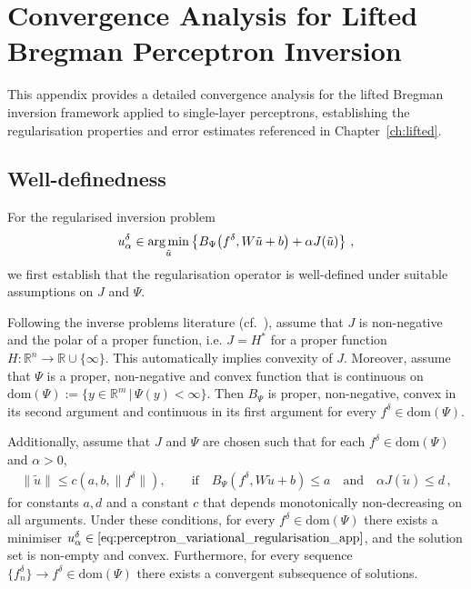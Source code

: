 \section{Convergence Analysis for Lifted Bregman Perceptron Inversion}\label{app:perceptron_inversion_convergence}

This appendix provides a detailed convergence analysis for the lifted Bregman inversion framework applied to single-layer perceptrons, establishing the regularisation properties and error estimates referenced in Chapter~\ref{ch:lifted}.

\subsection{Well-definedness}

For the regularised inversion problem
\begin{align}
    u_\alpha^\delta \in \operatorname*{arg\,min}_{\tilde{u}} \left\{ B_\Psi\!\left(f^\delta, W\tilde{u}+b\right) + \alpha J(\tilde{u}) \right\} \, ,\label{eq:perceptron_variational_regularisation_app}
\end{align}
we first establish that the regularisation operator is well-defined under suitable assumptions on $J$ and $\Psi$.

Following the inverse problems literature (cf.~\cite{benning2018modern}), assume that $J$ is non-negative and the polar of a proper function, i.e. $J = H^\ast$ for a proper function $H:\mathbb{R}^n \rightarrow \mathbb{R} \cup \{ \infty \}$. This automatically implies convexity of $J$. Moreover, assume that $\Psi$ is a proper, non-negative and convex function that is continuous on $\text{dom}(\Psi) := \{ y \in \mathbb{R}^m \,|\, \Psi(y) < \infty \}$. Then $B_\Psi$ is proper, non-negative, convex in its second argument and continuous in its first argument for every $f^\delta \in \text{dom}(\Psi)$. 

Additionally, assume that $J$ and $\Psi$ are chosen such that for each $f^\delta \in \text{dom}(\Psi)$ and $\alpha > 0$,
\begin{align*}
    \| \tilde{u} \| \leq c(a, b, \| f^\delta \|), \qquad \text{if} \quad B_\Psi(f^\delta, W\tilde{u} + b) \leq a \quad \text{and} \quad \alpha J(\tilde{u}) \leq d \, ,
\end{align*}
for constants $a, d$ and a constant $c$ that depends monotonically non-decreasing on all arguments. Under these conditions, for every $f^\delta \in \text{dom}(\Psi)$ there exists a minimiser $u_\alpha^\delta \in \eqref{eq:perceptron_variational_regularisation_app}$, and the solution set is non-empty and convex. Furthermore, for every sequence $\{f_n^\delta\} \to f^\delta \in \text{dom}(\Psi)$ there exists a convergent subsequence of solutions.

